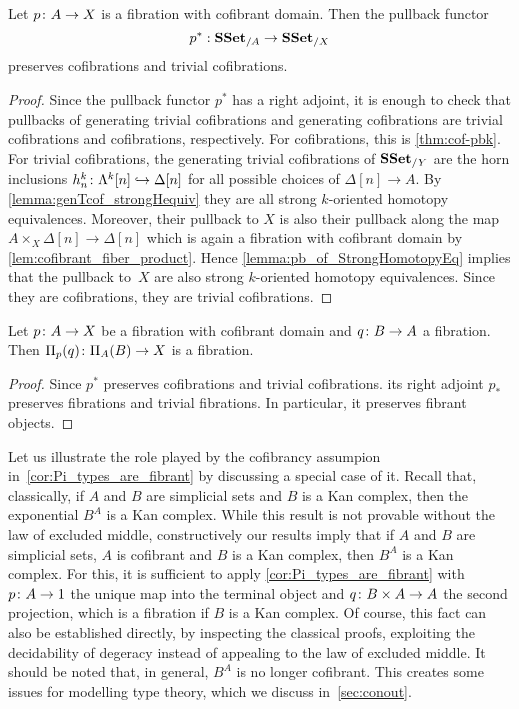 \documentclass[reqno,10pt,a4paper,oneside,draft]{amsart}
\begin{document}
\begin{proposition}\label{prop:Frobenius}
Let $p \colon A \rightarrow X$ is a fibration with cofibrant domain. Then the pullback functor 
\[
p^* : \mathbf{SSet}_{/A} \rightarrow \mathbf{SSet}_{/X}
\] 
preserves cofibrations and trivial cofibrations.
\end{proposition}


\begin{proof} Since the pullback functor $p^*$ has a right adjoint,  it is enough to check that pullbacks of generating trivial cofibrations and generating cofibrations are trivial cofibrations and cofibrations, respectively. For cofibrations, this is \cref{thm:cof-pbk}. For trivial cofibrations, the generating trivial cofibrations of $\mathbf{SSet}_{/Y}$ are the horn inclusions $h^k_n \colon \Lambda^{k}[n] \hookrightarrow \Delta[n]$ for all possible choices of $\Delta[n] \rightarrow A$. By \cref{lemma:genTcof_strongHequiv} they are all strong $k$-oriented homotopy equivalences. Moreover, their pullback to $X$ is also their pullback along the map $A \times_X \Delta[n] \rightarrow \Delta[n]$ which is again a fibration with cofibrant domain by \cref{lem:cofibrant_fiber_product}. Hence  \cref{lemma:pb_of_StrongHomotopyEq} implies that the pullback 
to~$X$ are also strong $k$-oriented homotopy equivalences. Since they are cofibrations, they are trivial cofibrations.
\end{proof}

\begin{corollary}\label{cor:Pi_types_are_fibrant}
Let $p \colon A \rightarrow X$ be a fibration with cofibrant domain and $q \colon B \rightarrow A$ a fibration. Then $\Pi_p(q) \colon \Pi_A(B) \rightarrow X$ is a fibration.
\end{corollary}

\begin{proof}
Since $p^*$ preserves cofibrations and trivial cofibrations. its right adjoint $p_*$ preserves fibrations and trivial fibrations. In particular, it preserves fibrant objects.
\end{proof}


Let us illustrate the role played by the cofibrancy assumpion in~\cref{cor:Pi_types_are_fibrant} by discussing
a special case of it. Recall that, classically,  if $A$ and $B$ are simplicial
sets and $B$ is a Kan complex, then the exponential $B^A$ is a Kan complex. While this result is
not provable without the law of excluded middle, constructively our results imply that if $A$ and $B$ are simplicial sets, $A$ is cofibrant and $B$ is a Kan complex, then $B^A$ is a Kan complex. For this, it is sufficient to apply \cref{cor:Pi_types_are_fibrant}
with $p \colon A \to 1$ the unique map into the terminal object and $q \colon B \times A \to A$ the second projection, which is a fibration if $B$ is a Kan complex. Of course, this fact can also be established directly, by inspecting the classical proofs, exploiting the decidability of degeracy instead of appealing to the law of excluded middle.
It should be noted that, in general, $B^A$ is no longer cofibrant. This creates some issues for modelling type
theory, which we discuss in~\cref{sec:conout}.
\end{document}
